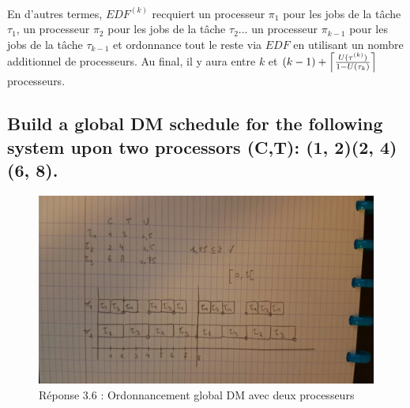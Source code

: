 \paragraph{}
En d'autres termes, $EDF^{(k)}$ recquiert un processeur $\pi_{1}$ pour les jobs de la tâche $\tau_{1}$, un processeur $\pi_{2}$ pour les jobs de la tâche $\tau_{2}$... un processeur $\pi_{k-1}$ pour les jobs de la tâche $\tau_{k-1}$ et ordonnance tout le reste via $EDF$ en utilisant un nombre additionnel de processeurs. Au final, il y aura entre $k$ et $(k-1) + \ceil[\Big]{\frac{U(\tau^{(k)})}{1 - U(\tau_{k})}}$ processeurs.


\subsection{Build a global DM schedule for the following system upon two processors (C,T): (1, 2)(2, 4)(6, 8).}
\begin{figure}[H]
	\centering
	\includegraphics[angle=90,width=\textwidth]{img_3_6__0}
    \caption{Réponse 3.6 : Ordonnancement global DM avec deux processeurs}
\end{figure}

